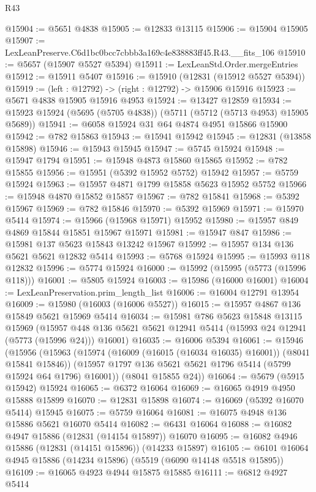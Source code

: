 \begin{lexlean}{R43}
\begin{coremodule}
@15904 := @5651 @4838
@15905 := @12833 @13115
@15906 := @15904 @15905
@15907 := LexLeanPreserve.C6d1bc0bcc7cbbb3a169c4e838883ff45.R43.__fits_106
@15910 := @5657 (@15907 @5527 @5394)
@15911 := LexLeanStd.Order.mergeEntries
@15912 := @15911 @5407
@15916 := @15910 (@12831 (@15912 @5527 @5394))
@15919 := (left : @12792) -> (right : @12792) -> @15906 @15916
@15923 := @5671 @4838 @15905 @15916 @4953
@15924 := @13427 @12859
@15934 := @15923 @15924 (@5695 (@5705 @4838)) (@5711 (@5712 (@5713 @4953) @15905 @5689))
@15941 := @6058 @15924 @31 @64 @4874 @4951 @15866 @15900
@15942 := @782 @15863
@15943 := @15941 @15942
@15945 := @12831 (@13858 @15898)
@15946 := @15943 @15945
@15947 := @5745 @15924
@15948 := @15947 @1794
@15951 := @15948 @4873 @15860 @15865
@15952 := @782 @15855
@15956 := @15951 (@5392 @15952 @5752) @15942
@15957 := @5759 @15924
@15963 := @15957 @4871 @1799 @15858 @5623 @15952 @5752
@15966 := @15948 @4870 @15852 @15857
@15967 := @782 @15841
@15968 := @5392 @15967
@15969 := @782 @15846
@15970 := @5392 @15969
@15971 := @15970 @5414
@15974 := @15966 (@15968 @15971) @15952
@15980 := @15957 @849 @4869 @15844 @15851 @15967 @15971
@15981 := @15947 @847
@15986 := @15981 @137 @5623 @15843 @13242 @15967
@15992 := @15957 @134 @136 @5621 @5621 @12832 @5414
@15993 := @5768 @15924
@15995 := @15993 @118 @12832
@15996 := @5774 @15924
@16000 := @15992 (@15995 (@5773 (@15996 @118)))
@16001 := @5805 @15924
@16003 := @15986 (@16000 @16001)
@16004 := LexLeanPreservation.prim_length_list
@16006 := @16004 @12791 @13954
@16009 := @15980 (@16003 (@16006 @5527))
@16015 := @15957 @4867 @136 @15849 @5621 @15969 @5414
@16034 := @15981
    @786
    @5623
    @15848
    @13115
    @15969
    (@15957 @448 @136 @5621 @5621 @12941 @5414 (@15993 @24 @12941 (@5773 (@15996 @24))) @16001)
@16035 := @16006 @5394
@16061 := @15946
    (@15956
      (@15963
        (@15974 (@16009 (@16015 (@16034 @16035) @16001)) (@8041 @15841 @15846))
        (@15957 @1797 @136 @5621 @5621 @1796 @5414 (@5799 @15924 @64 @1796) @16001))
      (@8041 @15855 @24))
@16064 := @5679 (@5915 @15942) @15924
@16065 := @6372 @16064
@16069 := @16065 @4919 @4950 @15888 @15899
@16070 := @12831 @15898
@16074 := @16069 (@5392 @16070 @5414) @15945
@16075 := @5759 @16064
@16081 := @16075 @4948 @136 @15886 @5621 @16070 @5414
@16082 := @6431 @16064
@16088 := @16082 @4947 @15886 (@12831 (@14154 @15897)) @16070
@16095 := @16082 @4946 @15886 (@12831 (@14151 @15896)) (@14233 @15897)
@16105 := @6101 @16064 @4945 @15886 (@14234 @15896) (@5519 (@6090 @14148 @5518 @15895))
@16109 := @16065 @4923 @4944 @15875 @15885
@16111 := @6812 @4927 @5414

\end{coremodule}
\end{lexlean}
